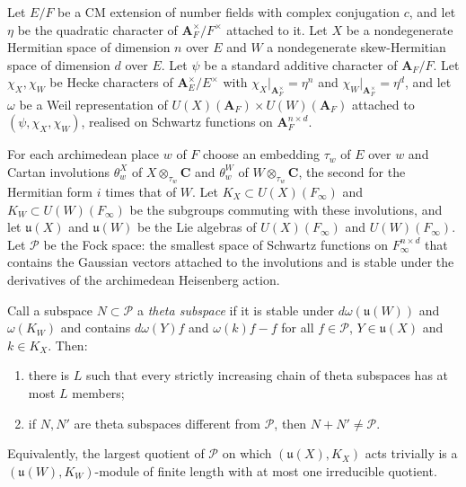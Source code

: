 \begin{theorem}\label{lit-howe-duality-real}
Let $E/F$ be a CM extension of number fields with complex conjugation $c$, and
let $\eta$ be the quadratic character of $\mathbf A_F^\times/F^\times$
attached to it. Let $X$ be a nondegenerate Hermitian space of dimension $n$
over $E$ and $W$ a nondegenerate skew-Hermitian space of dimension $d$ over
$E$. Let $\psi$ be a standard additive character of $\mathbf A_F/F$. Let
$\chi_X,\chi_W$ be Hecke characters of $\mathbf A_E^\times/E^\times$ with
$\chi_X|_{\mathbf A_F^\times}=\eta^n$ and
$\chi_W|_{\mathbf A_F^\times}=\eta^d$, and let $\omega$ be a Weil
representation of $U(X)(\mathbf A_F)\times U(W)(\mathbf A_F)$ attached to
$(\psi,\chi_X,\chi_W)$, realised on Schwartz functions on
$\mathbf A_F^{n\times d}$.

For each archimedean place $w$ of $F$ choose an embedding $\tau_w$ of $E$
over $w$ and Cartan involutions $\theta^X_w$ of $X\otimes_{\tau_w}\mathbf C$
and $\theta^W_w$ of $W\otimes_{\tau_w}\mathbf C$, the second for the
Hermitian form $i$ times that of $W$. Let $K_X\subset U(X)(F_\infty)$ and
$K_W\subset U(W)(F_\infty)$ be the subgroups commuting with these
involutions, and let $\mathfrak u(X)$ and $\mathfrak u(W)$ be the Lie algebras
of $U(X)(F_\infty)$ and $U(W)(F_\infty)$. Let $\mathcal P$ be the Fock space:
the smallest space of Schwartz functions on $F_\infty^{n\times d}$ that
contains the Gaussian vectors attached to the involutions and is stable under
the derivatives of the archimedean Heisenberg action.

Call a subspace $N\subset\mathcal P$ a \emph{theta subspace} if it is stable under
$d\omega(\mathfrak u(W))$ and $\omega(K_W)$ and contains $d\omega(Y)f$ and
$\omega(k)f-f$ for all $f\in\mathcal P$, $Y\in\mathfrak u(X)$ and
$k\in K_X$. Then:
\begin{enumerate}
\item there is $L$ such that every strictly increasing chain of theta
  subspaces has at most $L$ members;
\item if $N,N'$ are theta subspaces different from $\mathcal P$, then
  $N+N'\neq\mathcal P$.
\end{enumerate}
Equivalently, the largest quotient of $\mathcal P$ on which
$(\mathfrak u(X),K_X)$ acts trivially is a $(\mathfrak u(W),K_W)$-module of
finite length with at most one irreducible quotient.
\end{theorem}

